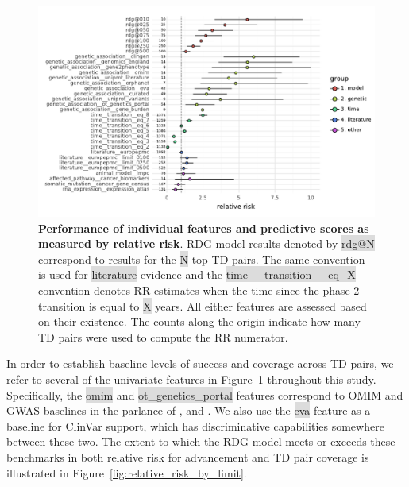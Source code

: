 \documentclass{article}
\begin{document}
\begin{figure}[!htb]
  \centering
  \captionsetup{width=.9\linewidth}
  \includegraphics[width=1\textwidth]{relative_risk_core_features.pdf}
  \caption{
    \textbf{Performance of individual features and predictive scores as measured by relative risk}.
    RDG model results denoted by \colorbox{Gainsboro}{rdg@N} correspond to results for the \colorbox{Gainsboro}{N} top TD pairs. The same convention is used for \colorbox{Gainsboro}{literature} evidence and the \colorbox{Gainsboro}{time\_\_transition\_\_eq\_X} convention denotes RR estimates when the time since the phase 2 transition is equal to \colorbox{Gainsboro}{X} years. All either features are assessed based on their existence. The counts along the origin indicate how many TD pairs were used to compute the RR numerator.
  }
  \label{fig:relative_risk_core_features}
\end{figure}

In order to establish baseline levels of success and coverage across TD pairs, we refer to several of the univariate features in Figure~\ref{fig:relative_risk_core_features} throughout this study. Specifically, the \colorbox{Gainsboro}{omim} and \colorbox{Gainsboro}{ot\_genetics\_portal} features correspond to OMIM and GWAS baselines in the parlance of \cite{King2019-rc}, \cite{Nelson2015-eg} and \cite{Minikel2023.06.23.23291765}. We also use the \colorbox{Gainsboro}{eva} feature as a baseline for ClinVar support, which has discriminative capabilities somewhere between these two. The extent to which the RDG model meets or exceeds these benchmarks in both relative risk for advancement and TD pair coverage is illustrated in Figure~\ref{fig:relative_risk_by_limit}.
\end{document}
